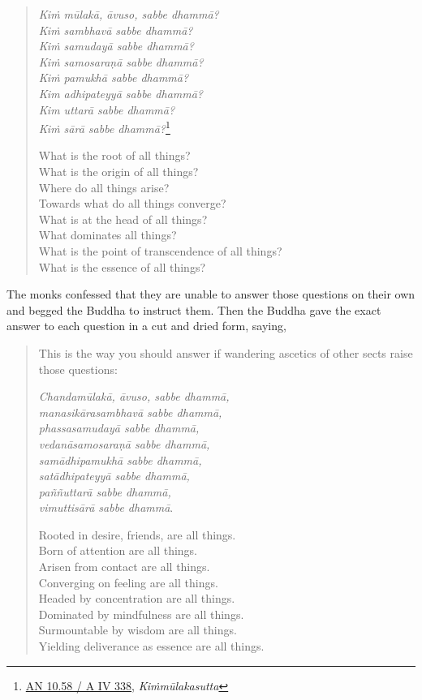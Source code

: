 \begin{quote}
\emph{Kiṁ mūlakā, āvuso, sabbe dhammā?}\\
\emph{Kiṁ sambhavā sabbe dhammā?}\\
\emph{Kiṁ samudayā sabbe dhammā?}\\
\emph{Kiṁ samosaraṇā sabbe dhammā?}\\
\emph{Kiṁ pamukhā sabbe dhammā?}\\
\emph{Kim adhipateyyā sabbe dhammā?}\\
\emph{Kim uttarā sabbe dhammā?}\\
\emph{Kiṁ sārā sabbe dhammā?}\footnote{\href{https://suttacentral.net/an10.58/pli/ms}{AN 10.58 / A IV 338}, \emph{Kiṁmūlakasutta}}

What is the root of all things?\\
What is the origin of all things?\\
Where do all things arise?\\
Towards what do all things converge?\\
What is at the head of all things?\\
What dominates all things?\\
What is the point of transcendence of all things?\\
What is the essence of all things?
\end{quote}

The monks confessed that they are unable to answer those questions on their own and begged the Buddha to instruct them. Then the Buddha gave the exact answer to each question in a cut and dried form, saying,

\begin{quote}
This is the way you should answer if wandering ascetics of other sects raise those questions:

\emph{Chandamūlakā, āvuso, sabbe dhammā,}\\
\emph{manasikārasambhavā sabbe dhammā,}\\
\emph{phassasamudayā sabbe dhammā,}\\
\emph{vedanāsamosaraṇā sabbe dhammā,}\\
\emph{samādhipamukhā sabbe dhammā,}\\
\emph{satādhipateyyā sabbe dhammā,}\\
\emph{paññuttarā sabbe dhammā,}\\
\emph{vimuttisārā sabbe dhammā}.

Rooted in desire, friends, are all things.\\
Born of attention are all things.\\
Arisen from contact are all things.\\
Converging on feeling are all things.\\
Headed by concentration are all things.\\
Dominated by mindfulness are all things.\\
Surmountable by wisdom are all things.\\
Yielding deliverance as essence are all things.
\end{quote}

